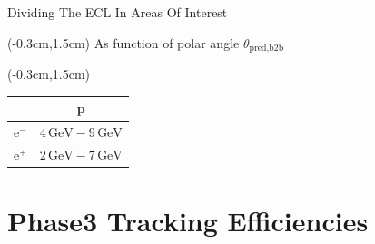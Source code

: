 \documentclass[8pt]{beamer}
\begin{document}
\begin{frame}{Dividing The ECL In Areas Of Interest}
	
	\pause[4]
	
	\begin{textblock*}{5cm}(-0.3cm,1.5cm)
	As function of polar angle $\theta_{\textrm{pred,b2b}}$
\end{textblock*}
\begin{textblock*}{5cm}(-0.3cm,1.5cm)
	\begin{table}[h!]
		\centering
		\begin{tabular}{lc}
			&p\\
			\hline
			$\textrm{e}^-$& $4\,\textrm{GeV} - 9\,\textrm{GeV}$\\	
			\pause[5]
			$\textrm{e}^+$& $2\,\textrm{GeV} - 7\,\textrm{GeV}$\\	
		\end{tabular}
		
	\end{table}
\end{textblock*}









\end{frame}




\section{Phase3 Tracking Efficiencies}
\end{document}
